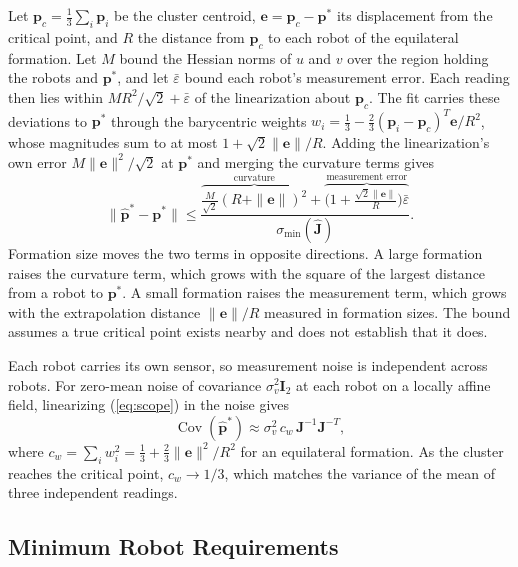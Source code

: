 \documentclass[lettersize,journal]{IEEEtran}
\begin{document}
Let $\mathbf{p}_c = \frac{1}{3}\sum_i\mathbf{p}_i$ be the cluster centroid, $\mathbf{e} = \mathbf{p}_c - \mathbf{p}^*$ its displacement from the critical point, and $R$ the distance from $\mathbf{p}_c$ to each robot of the equilateral formation. Let $M$ bound the Hessian norms of $u$ and $v$ over the region holding the robots and $\mathbf{p}^*$, and let $\bar{\varepsilon}$ bound each robot's measurement error. Each reading then lies within $MR^2/\sqrt{2} + \bar{\varepsilon}$ of the linearization about $\mathbf{p}_c$. The fit carries these deviations to $\mathbf{p}^*$ through the barycentric weights $w_i = \frac{1}{3} - \frac{2}{3}(\mathbf{p}_i - \mathbf{p}_c)^T\mathbf{e}/R^2$, whose magnitudes sum to at most $1 + \sqrt{2}\|\mathbf{e}\|/R$. Adding the linearization's own error $M\|\mathbf{e}\|^2/\sqrt{2}$ at $\mathbf{p}^*$ and merging the curvature terms gives
\begin{equation}\label{eq:bound}
\|\hat{\mathbf{p}}^* - \mathbf{p}^*\| \le \frac{\overbrace{\tfrac{M}{\sqrt{2}}(R + \|\mathbf{e}\|)^2}^{\text{curvature}} + \overbrace{\bigl(1 + \tfrac{\sqrt{2}\|\mathbf{e}\|}{R}\bigr)\bar{\varepsilon}}^{\text{measurement error}}}{\sigma_{\min}(\hat{\mathbf{J}})}.
\end{equation}
Formation size moves the two terms in opposite directions. A large formation raises the curvature term, which grows with the square of the largest distance from a robot to $\mathbf{p}^*$. A small formation raises the measurement term, which grows with the extrapolation distance $\|\mathbf{e}\|/R$ measured in formation sizes. The bound assumes a true critical point exists nearby and does not establish that it does.

Each robot carries its own sensor, so measurement noise is independent across robots. For zero-mean noise of covariance $\sigma_v^2\mathbf{I}_2$ at each robot on a locally affine field, linearizing (\ref{eq:scope}) in the noise gives
\begin{equation}\label{eq:cov}
\operatorname{Cov}(\hat{\mathbf{p}}^*) \approx \sigma_v^2\, c_w\, \mathbf{J}^{-1}\mathbf{J}^{-T},
\end{equation}
where $c_w = \sum_i w_i^2 = \frac{1}{3} + \frac{2}{3}\|\mathbf{e}\|^2/R^2$ for an equilateral formation. As the cluster reaches the critical point, $c_w \to 1/3$, which matches the variance of the mean of three independent readings.


\subsection{Minimum Robot Requirements}
\end{document}
